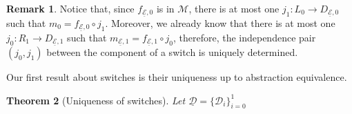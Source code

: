 \documentclass[a4paper]{article}
\newcommand{\dder}[1]{\mathscr{#1}}
\newcommand{\der}[1]{\underline{\dder{#1}}}
\newtheorem{theorem}{Theorem}[section]
\theoremstyle{definition}
\newtheorem{remark}[theorem]{Remark}
\begin{document}
\begin{remark}\label{rem:fact}
	Notice that, since $f_{\der{E}, 0}$ is in $\mathcal{M}$, there is at most one $j_1\colon L_0\to D_{\der{E},0}$ such that $m_0=f_{\der{E}, 0} \circ j_1$. Moreover, we already know that there is at most one $j_0\colon R_1\to D_{\der{E},1}$ such that $m_{\der{E},1}=f_{\der{E},1}\circ j_0$, therefore, the independence pair $(j_0,j_1)$ between the component of a switch is uniquely determined.
\end{remark}

Our first result about switches is their uniqueness up to abstraction equivalence.

\begin{theorem}[Uniqueness of switches]\label{thm:switch_uni} Let $\der{D}=\{\dder{D}_i\}_{i=0}^1$  
	
\end{theorem}
\end{document}
